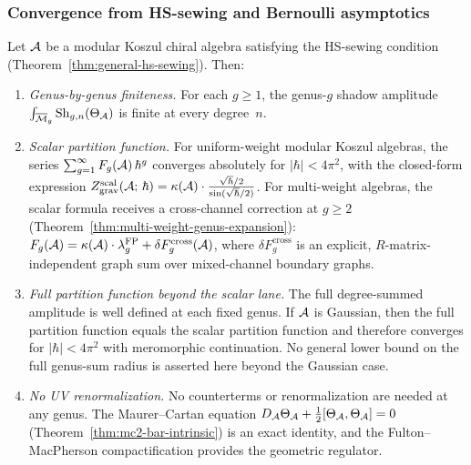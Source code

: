 \subsubsection{Convergence from HS-sewing and Bernoulli asymptotics}

\begin{theorem}
\label{thm:thqg-I-perturbative-finiteness}
Let $\mathcal{A}$ be a modular Koszul chiral algebra satisfying the HS-sewing condition \textup{(}Theorem~\textup{\ref{thm:general-hs-sewing})}. Then:
\begin{enumerate}[label=\textup{(\roman*)}]
\item \emph{Genus-by-genus finiteness.} For each $g \geq 1$, the genus-$g$ shadow amplitude $\int_{\overline{\mathcal{M}}_g} \operatorname{Sh}_{g,n}(\Theta_{\mathcal{A}})$ is finite at every degree~$n$.
\item \emph{Scalar partition function.} For uniform-weight modular Koszul algebras, the series $\sum_{g=1}^{\infty} F_g(\mathcal{A})\,\hbar^g$ converges absolutely for $|\hbar| < 4\pi^2$, with the closed-form expression $Z_{\mathrm{grav}}^{\mathrm{scal}}(\mathcal{A};\,\hbar) = \kappa(\mathcal{A}) \cdot \frac{\sqrt{\hbar}/2}{\sin(\sqrt{\hbar}/2)}$. For multi-weight algebras, the scalar formula receives a cross-channel correction at $g \geq 2$ (Theorem~\ref{thm:multi-weight-genus-expansion}): $F_g(\mathcal{A}) = \kappa(\mathcal{A})\cdot\lambda_g^{\mathrm{FP}} + \delta F_g^{\mathrm{cross}}(\mathcal{A})$, where $\delta F_g^{\mathrm{cross}}$ is an explicit, $R$-matrix-independent graph sum over mixed-channel boundary graphs.
\item \emph{Full partition function beyond the scalar lane.} The full degree-summed amplitude is well defined at each fixed genus. If $\mathcal{A}$ is Gaussian, then the full partition function equals the scalar partition function and therefore converges for $|\hbar| < 4\pi^2$ with meromorphic continuation. No general lower bound on the full genus-sum radius is asserted here beyond the Gaussian case.
\item \emph{No UV renormalization.} No counterterms or renormalization are needed at any genus. The Maurer--Cartan equation $D_{\mathcal{A}}\Theta_{\mathcal{A}} + \tfrac{1}{2}[\Theta_{\mathcal{A}},\Theta_{\mathcal{A}}] = 0$ (Theorem~\ref{thm:mc2-bar-intrinsic}) is an exact identity, and the Fulton--MacPherson compactification provides the geometric regulator.
\end{enumerate}
\end{theorem}

